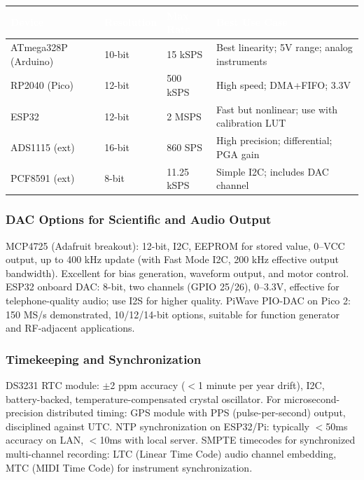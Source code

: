 \documentclass[11pt,letterpaper]{article}
\newcommand{\tableheader}[1]{\textbf{\sffamily\textcolor{white}{#1}}}
\begin{document}
\begin{center}
\begin{tabularx}{\textwidth}{L{2.5cm}C{1.8cm}C{2cm}L{4cm}}
\toprule
{}
\tableheader{Device} & \tableheader{Resolution} & \tableheader{Max Rate} & \tableheader{Best Use Case} \\
\midrule
ATmega328P (Arduino) & 10-bit & 15 kSPS & Best linearity; 5V range; analog instruments \\
RP2040 (Pico) & 12-bit & 500 kSPS & High speed; DMA+FIFO; 3.3V \\
ESP32 & 12-bit & 2 MSPS & Fast but nonlinear; use with calibration LUT \\
ADS1115 (ext) & 16-bit & 860 SPS & High precision; differential; PGA gain \\
PCF8591 (ext) & 8-bit & 11.25 kSPS & Simple I2C; includes DAC channel \\
\bottomrule
\end{tabularx}
\end{center}

\subsubsection{DAC Options for Scientific and Audio Output}

MCP4725 (Adafruit breakout): 12-bit, I2C, EEPROM for stored value, 0--VCC output, up to 400 kHz update (with Fast Mode I2C, 200 kHz effective output bandwidth). Excellent for bias generation, waveform output, and motor control. ESP32 onboard DAC: 8-bit, two channels (GPIO 25/26), 0--3.3V, effective for telephone-quality audio; use I2S for higher quality. PiWave PIO-DAC on Pico 2: 150 MS/s demonstrated, 10/12/14-bit options, suitable for function generator and RF-adjacent applications.

\subsubsection{Timekeeping and Synchronization}

DS3231 RTC module: $\pm$2 ppm accuracy ($<$1 minute per year drift), I2C, battery-backed, temperature-compensated crystal oscillator. For microsecond-precision distributed timing: GPS module with PPS (pulse-per-second) output, disciplined against UTC. NTP synchronization on ESP32/Pi: typically $<$50ms accuracy on LAN, $<$10ms with local server. SMPTE timecodes for synchronized multi-channel recording: LTC (Linear Time Code) audio channel embedding, MTC (MIDI Time Code) for instrument synchronization.
\end{document}
